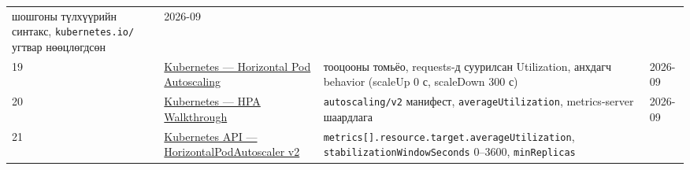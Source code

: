 \begin{longtable}[]{@{}llll@{}}
\begin{minipage}[t]{0.22\columnwidth}
шошгоны түлхүүрийн синтакс, \texttt{kubernetes.io/} угтвар нөөцлөгдсөн\strut
\end{minipage} & \begin{minipage}[t]{0.22\columnwidth}\raggedright
2026-09\strut
\end{minipage}\tabularnewline
\begin{minipage}[t]{0.22\columnwidth}\raggedright
19\strut
\end{minipage} & \begin{minipage}[t]{0.22\columnwidth}\raggedright
\href{https://kubernetes.io/docs/concepts/workloads/autoscaling/horizontal-pod-autoscale/}{Kubernetes --- Horizontal Pod Autoscaling}\strut
\end{minipage} & \begin{minipage}[t]{0.22\columnwidth}\raggedright
тооцооны томьёо, requests-д суурилсан Utilization, анхдагч behavior (scaleUp 0 с, scaleDown 300 с)\strut
\end{minipage} & \begin{minipage}[t]{0.22\columnwidth}\raggedright
2026-09\strut
\end{minipage}\tabularnewline
\begin{minipage}[t]{0.22\columnwidth}\raggedright
20\strut
\end{minipage} & \begin{minipage}[t]{0.22\columnwidth}\raggedright
\href{https://kubernetes.io/docs/tasks/run-application/horizontal-pod-autoscale-walkthrough/}{Kubernetes --- HPA Walkthrough}\strut
\end{minipage} & \begin{minipage}[t]{0.22\columnwidth}\raggedright
\texttt{autoscaling/v2} манифест, \texttt{averageUtilization}, metrics-server шаардлага\strut
\end{minipage} & \begin{minipage}[t]{0.22\columnwidth}\raggedright
2026-09\strut
\end{minipage}\tabularnewline
\begin{minipage}[t]{0.22\columnwidth}\raggedright
21\strut
\end{minipage} & \begin{minipage}[t]{0.22\columnwidth}\raggedright
\href{https://kubernetes.io/docs/reference/kubernetes-api/workload-resources/horizontal-pod-autoscaler-v2/}{Kubernetes API --- HorizontalPodAutoscaler v2}\strut
\end{minipage} & \begin{minipage}[t]{0.22\columnwidth}\raggedright
\texttt{metrics{[}{]}.\allowbreak{}resource.\allowbreak{}target.\allowbreak{}averageUtilization}, \texttt{stabilizationWindowSeconds} 0--3600, \texttt{minReplicas}\strut

\end{minipage}
\end{longtable}
